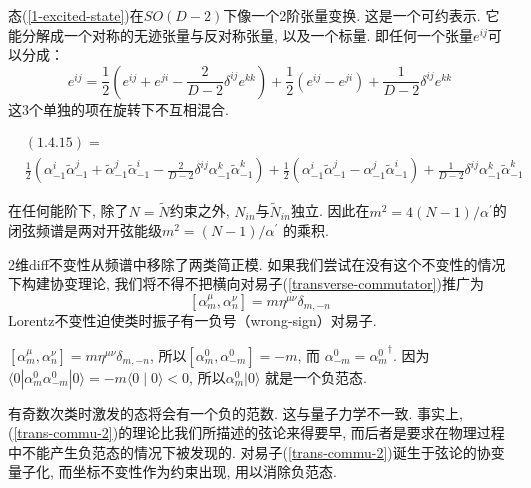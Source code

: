 态(\ref{1-excited-state})在$SO(D-2)$下像一个2阶张量变换. 这是一个可约表示. 它能分解成一个对称的无迹张量与反对称张量, 以及一个标量. 即任何一个张量$e^{ij}$可以分成：
\begin{equation}
e^{i j}=\frac{1}{2}\left(e^{i j}+e^{j i}-\frac{2}{D-2} \delta^{i j} e^{k k}\right)+\frac{1}{2}\left(e^{i j}-e^{j i}\right)+\frac{1}{D-2} \delta^{i j} e^{k k}
\end{equation}
这3个单独的项在旋转下不互相混合. \\
\begin{remark}
\begin{align*}
    &(1.4.15)= \\
    &\frac{1}{2}\left(\alpha_{-1}^{i} \tilde{\alpha}_{-1}^{j}+\tilde{\alpha}_{-1}^{j} \tilde{\alpha}_{-1}^{i}-\frac{2}{D-2} \delta^{i j} \alpha_{-1}^{k} \tilde{\alpha}_{-1}^{k}\right)
    +\frac{1}{2}\left(\alpha_{-1}^{i} \tilde{\alpha}_{-1}^{j}-\alpha_{-1}^{j} \tilde{\alpha}_{-1}^{i}\right)
    +\frac{1}{D-2} \delta^{i j} \alpha_{-1}^{k} \tilde{\alpha}_{-1}^{k} 
\end{align*}
\end{remark}


在任何能阶下, 除了$N=\tilde{N}$约束之外, $N_{in}$与$\tilde{N}_{in}$独立. 因此在$m^{2}=4(N-1)/\alpha^{\prime}$的闭弦频谱是两对开弦能级$m^{2}=(N-1) / \alpha^{\prime}$ 的乘积. 

2维diff不变性从频谱中移除了两类简正模. 如果我们尝试在没有这个不变性的情况下构建协变理论, 我们将不得不把横向对易子(\ref{transverse-commutator})推广为
\begin{equation}
\left[\alpha_{m}^{\mu}, \alpha_{n}^{\nu}\right]=m \eta^{\mu \nu} \delta_{m,-n} \label{trans-commu-2}
\end{equation}
Lorentz不变性迫使类时振子有一负号（wrong-sign）对易子. 

\begin{remark}
    $\left[\alpha_{m}^{\mu}, \alpha_{n}^{\nu}\right]=m \eta^{\mu \nu} \delta_{m,-n}$, 所以$\left[\alpha_{m}^{0}, \alpha_{-m}^{0}\right]=-m$, 而
$\alpha_{-m}^{0}={\alpha_{m}^{0}}^\dagger$. 因为$\langle 0|\alpha_{m}^{0} \alpha_{-m}^{0}| 0\rangle=-m\langle 0 \mid 0\rangle<0$, 所以$\alpha_{m}^{0}\vert 0\rangle$ 就是一个负范态.
\end{remark}
\noindent 有奇数次类时激发的态将会有一个负的范数. 这与量子力学不一致. 
事实上, (\ref{trans-commu-2})的理论比我们所描述的弦论来得要早, 而后者是要求在物理过程中不能产生负范态的情况下被发现的. 对易子(\ref{trans-commu-2})诞生于弦论的协变量子化, 而坐标不变性作为约束出现, 用以消除负范态. 

